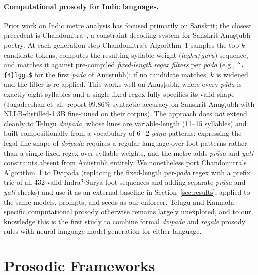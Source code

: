 \documentclass[11pt]{article}
\begin{document}
\paragraph{Computational prosody for Indic languages.}
Prior work on Indic metre analysis has focused primarily on Sanskrit;
the closest precedent is Chandomitra~\citep{jagadeeshan2026chandomitra},
a constraint-decoding system for Sanskrit Anu\d{s}\d{t}ubh poetry. At
each generation step Chandomitra's Algorithm~1 samples the top-$k$
candidate tokens, computes the resulting syllable-weight
(\textit{laghu}/\textit{guru}) sequence, and matches it against
pre-compiled \emph{fixed-length regex filters} per \textit{p\={a}da}
(e.g., \texttt{\^{}.\{4\}lgg.\$} for the first \textit{p\={a}da} of
Anu\d{s}\d{t}ubh); if no candidate matches, $k$ is widened and the
filter is re-applied. This works well on Anu\d{s}\d{t}ubh, where every
\textit{p\={a}da} is exactly eight syllables and a single fixed regex
fully specifies its valid shape (Jagadeeshan et~al.\ report 99.86\%
syntactic accuracy on Sanskrit Anu\d{s}\d{t}ubh with NLLB-distilled-1.3B
fine-tuned on their corpus). The approach does \emph{not} extend
cleanly to Telugu \textit{dvipada}, whose lines are variable-length
(11--15 syllables) and built compositionally from a vocabulary of 6+2
\textit{ga\d{n}a} patterns: expressing the legal line shape of
\textit{dvipada} requires a regular language over foot patterns rather
than a single fixed regex over syllable weights, and the metre adds
\textit{pr\={a}sa} and \textit{yati} constraints absent from
Anu\d{s}\d{t}ubh entirely. We nonetheless port Chandomitra's
Algorithm~1 to Dvipada (replacing the fixed-length per-\textit{p\={a}da}
regex with a prefix trie of all 432 valid Indra$^3$$\cdot$Surya foot
sequences and adding separate \textit{pr\={a}sa} and \textit{yati}
checks) and use it as an external baseline in
Section~\ref{sec:results}, applied to the same models, prompts, and
seeds as our enforcer. Telugu and Kannada-specific computational
prosody otherwise remains largely unexplored, and to our knowledge this
is the first study to combine formal \textit{dvipada} and
\textit{ragale} prosody rules with neural language model generation for
either language.

\section{Prosodic Frameworks}
\label{sec:prosody}
\end{document}
